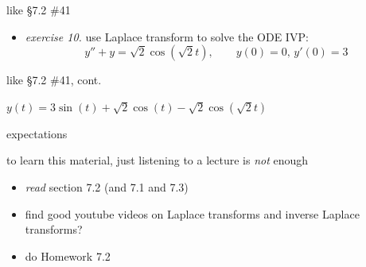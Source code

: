 \documentclass[dvipsnames,colorlinks]{beamer}
\begin{document}
\begin{frame}{like \S7.2 \#41}

\begin{itemize}
\item \emph{exercise 10.}  use Laplace transform to solve the ODE IVP:
    $$y''+y=\sqrt{2} \cos(\sqrt{2} t), \qquad y(0)=0, \, y'(0)=3$$

\vspace{50mm}
\end{itemize}
\end{frame}


\begin{frame}{like \S7.2 \#41, cont.}


\vspace{60mm}
\hfill $y(t) = 3 \sin(t) + \sqrt{2} \cos(t) - \sqrt{2}\cos(\sqrt{2} t)$
\end{frame}


\begin{frame}{expectations}

to learn this material, just listening to a lecture is \emph{not} enough
     \begin{itemize}
     \item \emph{read} section 7.2 (and 7.1 and 7.3)
     \item find good youtube videos on Laplace transforms and inverse Laplace transforms?
     \item do Homework 7.2
     \end{itemize}
\end{frame}
\end{document}
